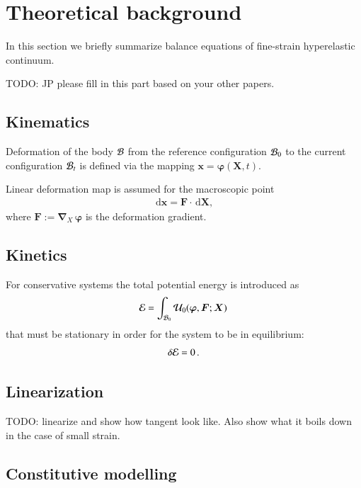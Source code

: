 \documentclass[preprint,12pt,times]{elsarticle}
\def\gz  #1{           \mbox{$\boldsymbol{#1}$}}
\def\d {\,\mbox{d}}
\def\mcl  #1{               {\cal #1}}
\begin{document}
\section{Theoretical background}
\label{sec:theory}

In this section we briefly summarize balance equations of fine-strain hyperelastic continuum.

{\color{red}
TODO: JP please fill in this part based on your other papers.
}

\subsection{Kinematics}

Deformation of the body $\mcl B$ from the reference configuration $\mcl B_0$ to the current configuration $\mcl B_t$
is defined via the mapping $\gz x = \gz \varphi (\gz X,t)$.

Linear deformation map is assumed for the macroscopic point
\begin{align}
\d \gz x = \gz F \cdot \d \gz X,
\end{align}
where $\gz F := \gz \nabla_{X} \, \gz \varphi$ is the deformation gradient.

\subsection{Kinetics}

For conservative systems the total potential energy is introduced as
\begin{align}
\mcl E = \int_{\mcl B_0} \mcl U_0(\gz \varphi, \gz F; \gz X) \,
\end{align}
that must be stationary in order for the system to be in equilibrium:
\begin{align}
\delta \mcl E = 0 \, .
\label{eq:stationary}
\end{align}

\subsection{Linearization}

{\color{red}TODO: linearize and show how tangent look like.
Also show what it boils down in the case of small strain.
}

\subsection{Constitutive modelling}
\end{document}

